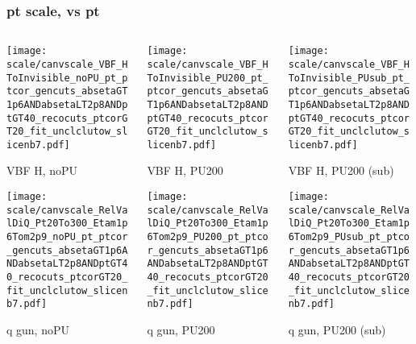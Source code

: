 \documentclass[8pt]{beamer}
\begin{document}
 \begin{frame}
  \frametitle{pt scale, vs pt}
  
  \begin{columns}
   \begin{column}{0.35\textwidth}
     \texttt{[image: scale/canvscale\_VBF\_HToInvisible\_noPU\_pt\_ptcor\_gencuts\_absetaGT1p6ANDabsetaLT2p8ANDptGT40\_recocuts\_ptcorGT20\_fit\_unclclutow\_slicenb7.pdf]}
     
     VBF H, noPU
    
     \texttt{[image: scale/canvscale\_RelValDiQ\_Pt20To300\_Etam1p6Tom2p9\_noPU\_pt\_ptcor\_gencuts\_absetaGT1p6ANDabsetaLT2p8ANDptGT40\_recocuts\_ptcorGT20\_fit\_unclclutow\_slicenb7.pdf]}
     
     q gun, noPU
   \end{column}
   \begin{column}{0.35\textwidth}
     \texttt{[image: scale/canvscale\_VBF\_HToInvisible\_PU200\_pt\_ptcor\_gencuts\_absetaGT1p6ANDabsetaLT2p8ANDptGT40\_recocuts\_ptcorGT20\_fit\_unclclutow\_slicenb7.pdf]}
     
     VBF H, PU200
    
     \texttt{[image: scale/canvscale\_RelValDiQ\_Pt20To300\_Etam1p6Tom2p9\_PU200\_pt\_ptcor\_gencuts\_absetaGT1p6ANDabsetaLT2p8ANDptGT40\_recocuts\_ptcorGT20\_fit\_unclclutow\_slicenb7.pdf]}
     
     q gun, PU200
   \end{column}
   \begin{column}{0.35\textwidth}
     \texttt{[image: scale/canvscale\_VBF\_HToInvisible\_PUsub\_pt\_ptcor\_gencuts\_absetaGT1p6ANDabsetaLT2p8ANDptGT40\_recocuts\_ptcorGT20\_fit\_unclclutow\_slicenb7.pdf]}
     
     VBF H, PU200 (sub)
    
     \texttt{[image: scale/canvscale\_RelValDiQ\_Pt20To300\_Etam1p6Tom2p9\_PUsub\_pt\_ptcor\_gencuts\_absetaGT1p6ANDabsetaLT2p8ANDptGT40\_recocuts\_ptcorGT20\_fit\_unclclutow\_slicenb7.pdf]}
     
     q gun, PU200 (sub)
   \end{column}
  \end{columns}
 \end{frame}
 
\end{document}
